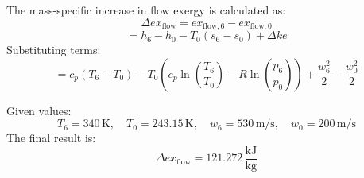 The mass-specific increase in flow exergy is calculated as:  
\[
\Delta ex_{\text{flow}} = ex_{\text{flow},6} - ex_{\text{flow},0}
\]  
\[
= h_6 - h_0 - T_0 (s_6 - s_0) + \Delta ke
\]  
Substituting terms:  
\[
= c_p (T_6 - T_0) - T_0 \left( c_p \ln \left( \frac{T_6}{T_0} \right) - R \ln \left( \frac{p_6}{p_0} \right) \right) + \frac{w_6^2}{2} - \frac{w_0^2}{2}
\]  

Given values:  
\[
T_6 = 340 \, \text{K}, \quad T_0 = 243.15 \, \text{K}, \quad w_6 = 530 \, \text{m/s}, \quad w_0 = 200 \, \text{m/s}
\]  
The final result is:  
\[
\Delta ex_{\text{flow}} = 121.272 \, \frac{\text{kJ}}{\text{kg}}
\]